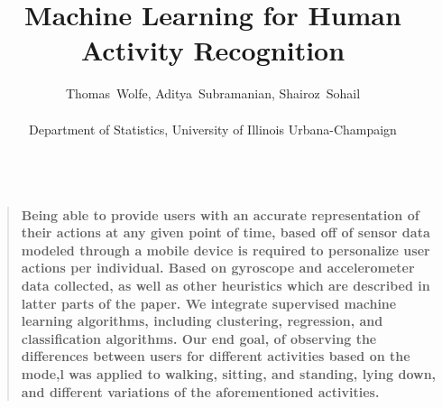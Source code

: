 \documentclass[12pt]{article}
\title{Machine Learning for Human Activity Recognition}
\author
{Thomas~Wolfe, Aditya~Subramanian, Shairoz~Sohail\\
\\
\normalsize{Department of Statistics, University of Illinois Urbana-Champaign}\\
\
}
\date{}
\newenvironment{sciabstract}{%
\begin{quote} \bf}
{\end{quote}}
\begin{document}
 


\baselineskip24pt


\maketitle 




\begin{sciabstract}
  Being able to provide users with an accurate representation of their actions at any given point of time, based off of sensor data modeled through a mobile device is required to personalize user actions per individual. Based on gyroscope and accelerometer data collected, as well as other heuristics which are described in latter parts of the paper. We integrate supervised machine learning algorithms, including clustering, regression, and classification algorithms.
Our end goal, of observing the differences between users for different activities based on the mode,l was applied to walking, sitting, and standing, lying down, and different variations of the aforementioned activities. 
\end{sciabstract}



\end{document}
